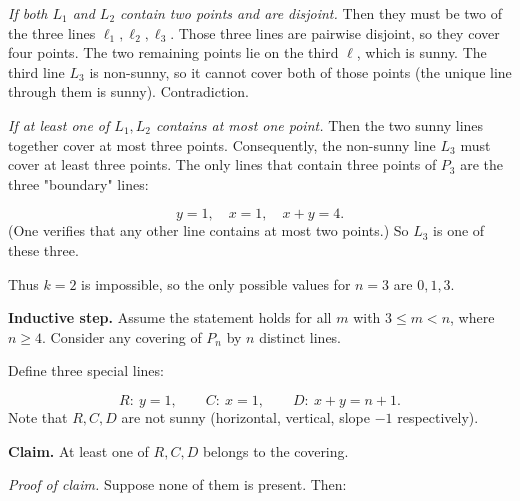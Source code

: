 \emph{If both \(L_1\) and \(L_2\) contain two points and are disjoint.} Then they must be two of the three lines \(\ell_1,\ell_2,\ell_3\). Those three lines are pairwise disjoint, so they cover four points. The two remaining points lie on the third \(\ell\), which is sunny. The third line \(L_3\) is non-sunny, so it cannot cover both of those points (the unique line through them is sunny). Contradiction.\par
\emph{If at least one of \(L_1, L_2\) contains at most one point.} Then the two sunny lines together cover at most three points. Consequently, the non-sunny line \(L_3\) must cover at least three points. The only lines that contain three points of \(P_3\) are the three "boundary" lines:\par
\[
y=1,\quad x=1,\quad x+y=4.
\]
(One verifies that any other line contains at most two points.) So \(L_3\) is one of these three.\par
{}
Thus \(k = 2\) is impossible, so the only possible values for \(n=3\) are \(0,1,3\).\par
\textbf{Inductive step.} Assume the statement holds for all \(m\) with \(3 \le m < n\), where \(n \ge 4\). Consider any covering of \(P_n\) by \(n\) distinct lines.\par
Define three special lines:\par
\[
R:\ y=1,\qquad C:\ x=1,\qquad D:\ x+y = n+1.
\]
Note that \(R, C, D\) are not sunny (horizontal, vertical, slope \(-1\) respectively).\par
\textbf{Claim.} At least one of \(R, C, D\) belongs to the covering.\par
\emph{Proof of claim.} Suppose none of them is present. Then:\par
{}
